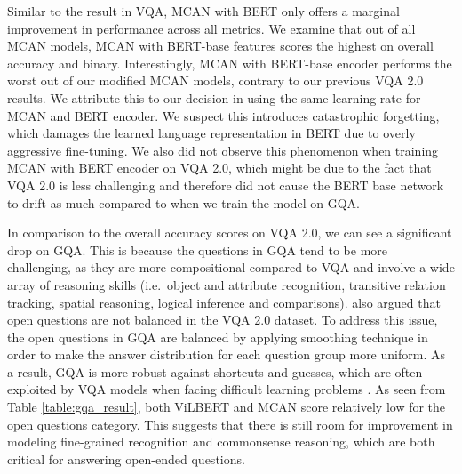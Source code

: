 \documentclass{article}
\begin{document}
Similar to the result in VQA, MCAN with BERT only offers a marginal improvement in performance across all metrics. We examine that out of all MCAN models, MCAN with BERT-base features scores the highest on overall accuracy and binary. Interestingly, MCAN with BERT-base encoder performs the worst out of our modified MCAN models, contrary to our previous VQA 2.0 results. We attribute this to our decision in using the same learning rate for MCAN and BERT encoder. We suspect this introduces catastrophic forgetting, which damages the learned language representation in BERT due to overly aggressive fine-tuning. We also did not observe this phenomenon when training MCAN with BERT encoder on VQA 2.0, which might be due to the fact that VQA 2.0 is less challenging and therefore did not cause the BERT base network to drift as much compared to when we train the model on GQA.


In comparison to the overall accuracy scores on VQA 2.0, we can see a significant drop on GQA. This is because the questions in GQA tend to be more challenging, as they are more compositional compared to VQA and involve a wide array of reasoning skills (i.e.\, object and attribute recognition, transitive relation tracking, spatial reasoning, logical inference and comparisons). \cite{hudson2019gqa} also argued that open questions are not balanced in the VQA 2.0 dataset. To address this issue, the open questions in GQA are balanced by applying smoothing technique in order to make the answer distribution for each question group more uniform. As a result, GQA is more robust against shortcuts and guesses, which are often exploited by VQA models when facing difficult learning problems \citep{agrawal12018gvqa}. As seen from Table \ref{table:gqa_result}, both ViLBERT and MCAN score relatively low for the open questions category. This suggests that there is still room for improvement in modeling fine-grained recognition and commonsense reasoning, which are both critical for answering open-ended questions.

\end{document}
